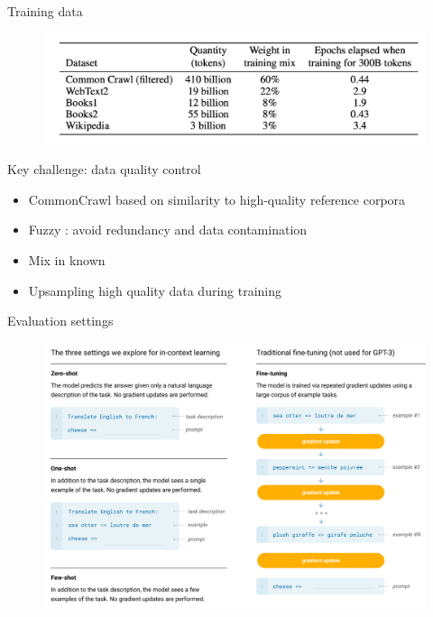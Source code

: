 \documentclass[usenames,dvipsnames,notes,11pt,aspectratio=169,hyperref={colorlinks=true, linkcolor=blue}]{beamer}
\begin{document}
\begin{frame}
    {Training data}
    \begin{figure}
        \includegraphics[height=0.4\textheight]{figures/gpt3-data}
    \end{figure}
Key challenge: data quality control
    \begin{itemize}
        \item {} CommonCrawl based on similarity to high-quality reference corpora 
        \item Fuzzy : avoid redundancy and data contamination
        \item Mix in known 
        \item Upsampling high quality data during training
    \end{itemize}
\end{frame}

\begin{frame}
    {Evaluation settings}
    \begin{figure}
        \includegraphics[height=0.9\textheight]{figures/gpt3-inf}
    \end{figure}
\end{frame}
\end{document}
